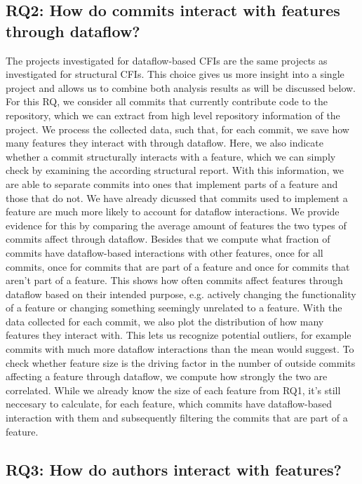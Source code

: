 \subsection*{\textbf{RQ2: How do commits interact with features through dataflow?}}

The projects investigated for dataflow-based CFIs are the same projects as investigated for structural CFIs.
This choice gives us more insight into a single project and allows us to combine both analysis results as will be discussed below.
For this RQ, we consider all commits that currently contribute code to the repository, 
which we can extract from high level repository information of the project.
We process the collected data, such that, for each commit, we save how many features they interact with through dataflow.
Here, we also indicate whether a commit structurally interacts with a feature, which we can simply check by examining the according structural report.
With this information, we are able to separate commits into ones that implement parts of a feature and those that do not. 
We have already dicussed that commits used to implement a feature are much more likely to account for dataflow interactions.
We provide evidence for this by comparing the average amount of features the two types of commits affect through dataflow. 
Besides that we compute what fraction of commits have dataflow-based interactions with other features, once for all commits, once for commits that are part of a feature and once for commits that aren't part of a feature.
This shows how often commits affect features through dataflow based on their intended purpose, e.g. actively changing the functionality of a feature or changing something seemingly unrelated to a feature. 
With the data collected for each commit, we also plot the distribution of how many features they interact with.
This lets us recognize potential outliers, for example commits with much more dataflow interactions than the mean would suggest.
To check whether feature size is the driving factor in the number of outside commits affecting a feature through dataflow, we compute how strongly the two are correlated.
While we already know the size of each feature from RQ1, it's still neccesary to calculate, for each feature, which commits have dataflow-based interaction with them and subsequently filtering the commits that are part of a feature.

\subsection*{\textbf{RQ3: How do authors interact with features?}}

